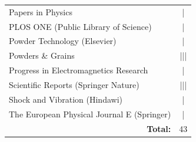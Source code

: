 \begin{center}
\begin{tabular}{l c}
    Papers in Physics                                                        & |                   \\
    PLOS ONE (Public Library of Science)                                     & |                   \\
    Powder Technology (Elsevier)                                             & |                   \\
    Powders \& Grains                                                        & |||                 \\
    Progress in Electromagnetics Research                                    & |                   \\
    Scientific Reports (Springer Nature)                                     & |||                 \\
    Shock and Vibration (Hindawi)                                            & |                   \\
    The European Physical Journal E (Springer)                               & |                   \\
    \midrule
    \multicolumn{1}{r}{\textbf{Total:}}                                      & 43                  \\
    \bottomrule
  \end{tabular}
\end{center}
